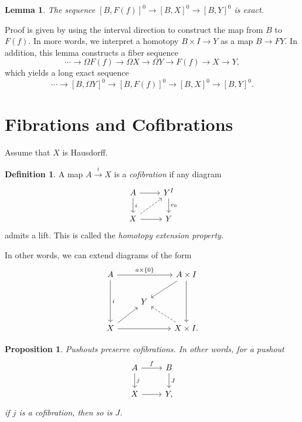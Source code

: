 \documentclass[leqno, openany]{memoir}
\newtheorem{prop}[thm]{Proposition}
\newtheorem{lem}[thm]{Lemma}
\theoremstyle{definition}
\newtheorem{defn}[thm]{Definition}
\theoremstyle{remark}
\theoremstyle{plain}
\theoremstyle{definition}
\theoremstyle{remark}
\begin{document}
\begin{lem}
    The sequence $[B,F(f)]^0 \to [B,X]^0 \to [B,Y]^0$ is exact.
\end{lem}

Proof is given by using the interval direction to construct the map from $B$ to $F(f)$. In more words, we interpret a homotopy $B \times I \to Y$ as a map $B \to FY$. In addition, this lemma constructs a fiber sequence
\[ \cdots \to \Omega F(f) \to \Omega X \to \Omega Y \to F(f) \to X \to Y, \]
which yields a long exact sequence
\[ \cdots \to [B, \Omega Y]^0 \to [B,F(f)]^0 \to [B,X]^0 \to [B,Y]^0. \]

\section{Fibrations and Cofibrations}%
\label{sec:fibrations_and_cofibrations}

Assume that $X$ is Hausdorff. 

\begin{defn}
    A map $ A \xrightarrow{i} X$ is a \textit{cofibration} if any diagram
    \begin{equation}
    \begin{tikzcd}
        A \arrow{r} \arrow{d}{i} & Y^I \arrow{d}{e_0} \\
        X \arrow{r} \arrow[dashrightarrow]{ur} & Y
    \end{tikzcd}
    \end{equation}
    admits a lift. This is called the \textit{homotopy extension property}. 
\end{defn}

In other words, we can extend diagrams of the form
\begin{equation}
\begin{tikzcd}
    A \arrow{rr}{a \times \{0\}} \arrow{dd}{i} & & A \times I \arrow{dd} \arrow{dl} \\
                                               & Y & \\
    X \arrow{rr} \arrow{ur} & & X \times I. \arrow[dashrightarrow]{ul}
\end{tikzcd}
\end{equation}

\begin{prop}
    Pushouts preserve cofibrations. In other words, for a pushout
    \begin{equation}
    \begin{tikzcd}
        A \arrow{r}{f} \arrow{d}{j} & B \arrow{d}{J} \\
        X \arrow{r} & Y,
    \end{tikzcd}
    \end{equation}
    if $j$ is a cofibration, then so is $J$.
\end{prop}
\end{document}
